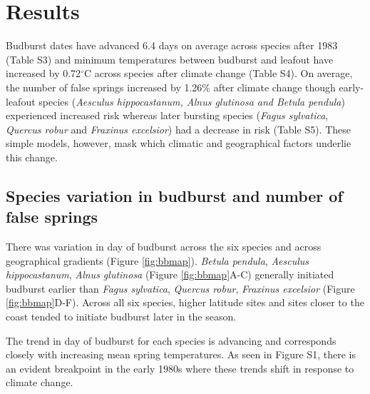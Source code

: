 \documentclass{article}\usepackage[]{graphicx}\usepackage[]{color}
\begin{document}
\renewcommand{\thetable}{\arabic{table}}
\renewcommand{\thefigure}{\arabic{figure}}
\renewcommand{\labelitemi}{$-$}


\section*{Results}
Budburst dates have advanced 6.4 days on average across species after 1983 (Table S3) and minimum temperatures between budburst and leafout have increased by 0.72$^{\circ}$C across species after climate change (Table S4). On average, the number of false springs increased by 1.26\% after climate change though early-leafout species (\textit{Aesculus hippocastanum, \textit{Alnus glutinosa} and \textit{Betula pendula}}) experienced increased risk whereas later bursting species (\textit{Fagus sylvatica}, \textit{Quercus robur} and \textit{Fraxinus excelsior}) had a decrease in risk (Table S5). These simple models, however, mask which climatic and geographical factors underlie this change.

\subsection*{Species variation in budburst and number of false springs}
There was variation in day of budburst across the six species and across geographical gradients (Figure \ref{fig:bbmap}). \textit{Betula pendula}, \textit{Aesculus hippocastanum}, \textit{Alnus glutinosa} (Figure \ref{fig:bbmap}A-C) generally initiated budburst earlier than \textit{Fagus sylvatica}, \textit{Quercus robur}, \textit{Fraxinus excelsior} (Figure \ref{fig:bbmap}D-F). Across all six species, higher latitude sites and sites closer to the coast tended to initiate budburst later in the season.  

The trend in day of budburst for each species is advancing and corresponds closely with increasing mean spring temperatures. As seen in Figure S1, there is an evident breakpoint in the early 1980s where these trends shift in response to climate change. 
\end{document}
